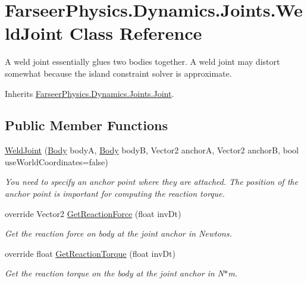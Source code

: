 \hypertarget{class_farseer_physics_1_1_dynamics_1_1_joints_1_1_weld_joint}{\section{Farseer\+Physics.\+Dynamics.\+Joints.\+Weld\+Joint Class Reference}
\label{class_farseer_physics_1_1_dynamics_1_1_joints_1_1_weld_joint}
}


A weld joint essentially glues two bodies together. A weld joint may distort somewhat because the island constraint solver is approximate.  




Inherits \hyperlink{class_farseer_physics_1_1_dynamics_1_1_joints_1_1_joint}{Farseer\+Physics.\+Dynamics.\+Joints.\+Joint}.

\subsection*{Public Member Functions}
\begin{DoxyCompactItemize}
\item 
\hyperlink{class_farseer_physics_1_1_dynamics_1_1_joints_1_1_weld_joint_a6ee350e2dda9cb24c09dd9e458d64d5b}{Weld\+Joint} (\hyperlink{class_farseer_physics_1_1_dynamics_1_1_body}{Body} body\+A, \hyperlink{class_farseer_physics_1_1_dynamics_1_1_body}{Body} body\+B, Vector2 anchor\+A, Vector2 anchor\+B, bool use\+World\+Coordinates=false)
\begin{DoxyCompactList}\small\item\em You need to specify an anchor point where they are attached. The position of the anchor point is important for computing the reaction torque. \end{DoxyCompactList}\item 
override Vector2 \hyperlink{class_farseer_physics_1_1_dynamics_1_1_joints_1_1_weld_joint_afe396a2c0621221c31b0a728577ecad7}{Get\+Reaction\+Force} (float inv\+Dt)
\begin{DoxyCompactList}\small\item\em Get the reaction force on body at the joint anchor in Newtons. \end{DoxyCompactList}\item 
override float \hyperlink{class_farseer_physics_1_1_dynamics_1_1_joints_1_1_weld_joint_a29b94e2a5b6d4f9c5a68bffef71cf80b}{Get\+Reaction\+Torque} (float inv\+Dt)
\begin{DoxyCompactList}\small\item\em Get the reaction torque on the body at the joint anchor in N$\ast$m. \end{DoxyCompactList}\end{DoxyCompactItemize}
